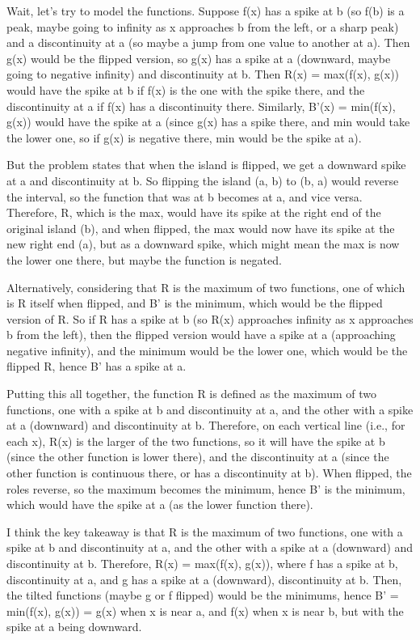 Wait, let's try to model the functions. Suppose f(x) has a spike at b (so f(b) is a peak, maybe going to infinity as x approaches b from the left, or a sharp peak) and a discontinuity at a (so maybe a jump from one value to another at a). Then g(x) would be the flipped version, so g(x) has a spike at a (downward, maybe going to negative infinity) and discontinuity at b. Then R(x) = max(f(x), g(x)) would have the spike at b if f(x) is the one with the spike there, and the discontinuity at a if f(x) has a discontinuity there. Similarly, B'(x) = min(f(x), g(x)) would have the spike at a (since g(x) has a spike there, and min would take the lower one, so if g(x) is negative there, min would be the spike at a). 

But the problem states that when the island is flipped, we get a downward spike at a and discontinuity at b. So flipping the island (a, b) to (b, a) would reverse the interval, so the function that was at b becomes at a, and vice versa. Therefore, R, which is the max, would have its spike at the right end of the original island (b), and when flipped, the max would now have its spike at the new right end (a), but as a downward spike, which might mean the max is now the lower one there, but maybe the function is negated. 

Alternatively, considering that R is the maximum of two functions, one of which is R itself when flipped, and B' is the minimum, which would be the flipped version of R. So if R has a spike at b (so R(x) approaches infinity as x approaches b from the left), then the flipped version would have a spike at a (approaching negative infinity), and the minimum would be the lower one, which would be the flipped R, hence B' has a spike at a. 

Putting this all together, the function R is defined as the maximum of two functions, one with a spike at b and discontinuity at a, and the other with a spike at a (downward) and discontinuity at b. Therefore, on each vertical line (i.e., for each x), R(x) is the larger of the two functions, so it will have the spike at b (since the other function is lower there), and the discontinuity at a (since the other function is continuous there, or has a discontinuity at b). When flipped, the roles reverse, so the maximum becomes the minimum, hence B' is the minimum, which would have the spike at a (as the lower function there). 

I think the key takeaway is that R is the maximum of two functions, one with a spike at b and discontinuity at a, and the other with a spike at a (downward) and discontinuity at b. Therefore, R(x) = max(f(x), g(x)), where f has a spike at b, discontinuity at a, and g has a spike at a (downward), discontinuity at b. Then, the tilted functions (maybe g or f flipped) would be the minimums, hence B' = min(f(x), g(x)) = g(x) when x is near a, and f(x) when x is near b, but with the spike at a being downward. 

